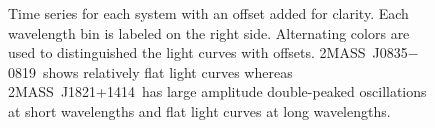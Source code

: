 \documentclass[twocolumn]{aastex6}
\newcommand{\sha}{2MASS~J0835$-$0819}
\newcommand{\shb}{2MASS~J1821+1414}
\begin{document}
\begin{figure}[!t]
\centering
{}
	\caption{Time series for each system with an offset added for clarity. Each wavelength bin is labeled on the right side. Alternating colors are used to distinguished the light curves with offsets. \sha\ shows relatively flat light curves whereas \shb\ has large amplitude double-peaked oscillations at short wavelengths and flat light curves at long wavelengths.}
	\label{fig:tserPfold}
\end{figure} 
\end{document}
